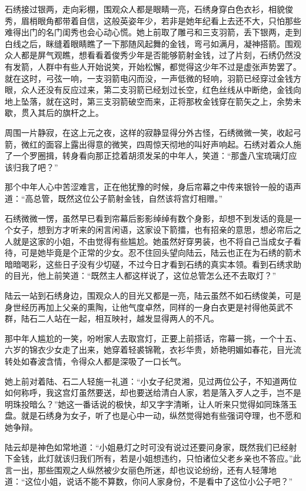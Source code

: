 石绣接过银两，走向彩棚，围观众人都是眼睛一亮，石绣身穿白色衣衫，相貌俊秀，眉梢眼角都带着自信，这般英姿年少，若非是她年纪看上去还不大，只怕那些难得出门的名门闺秀也会心动心慌。她上前取了雕弓和三支羽箭，丢下银两，走到白线之后，眯缝着眼睛瞧了一下那随风起舞的金钱，弯弓如满月，凝神搭箭。围观众人都是屏气观瞧，想看看着俊秀少年是否能够箭射金钱，过了片刻，石绣仍然没有发箭，人群中有些人开始说笑，开始松懈，都觉得这少年不过是虚张声势罢了。就在这时，弓弦一响，一支羽箭电闪而没，一声低微的轻响，羽箭已经穿过金钱方眼，众人还没有反应过来，第二支羽箭已经划过长空，红色丝线从中断绝，金钱向地上坠落，就在这时，第三支羽箭破空而来，正将那枚金钱穿在箭矢之上，余势未歇，贯入其后的旗杆之上。

周围一片静寂，在这上元之夜，这样的寂静显得分外古怪，石绣微微一笑，收起弓箭，微红的面容上露出得意的微笑，四周惊天彻地的叫好声响起。石绣对着众人施了一个罗圈揖，转身看向那正捻着胡须发呆的中年人，笑道：“那盏八宝琉璃灯应该归我了吧？”

那个中年人心中苦涩难言，正在他犹豫的时候，身后帘幕之中传来银铃一般的语声道：“高总管，既然这位公子箭射金钱，自然该将宫灯相赠。”

石绣微微一愣，虽然早已看到帘幕后影影绰绰有数个身影，却想不到发话的竟是一个女子，想到方才听来的闲言闲语，这家设下箭擂，也有招亲的意思，想必帘后之人就是这家的小姐，不由觉得有些尴尬。她虽然好穿男装，也不将自己当成女子看待，可是她毕竟是个正常的少女。忍不住回头望向陆云，陆云也正在为石绣的箭术暗暗喝彩，这些日子没有少切磋，不过今日才看到石绣的真实本领。看到石绣求助的目光，他上前笑道：“既然主人都这样说了，这位总管怎么还不去取灯？”

陆云一站到石绣身边，围观众人的目光又都是一亮，陆云虽然不如石绣俊美，可是身世经历再加上父亲的熏陶，让他气度卓然，同样的一身白衣更是衬得他英武不群，陆石二人站在一起，相互映衬，越发显得两人的不凡。

那中年人尴尬的一笑，吩咐家人去取宫灯，正要上前搭话，帘幕一挑，一个十五、六岁的锦衣少女走了出来，她穿着轻裘锦靴，衣衫华贵，娇艳明媚如春花，目光流转处如春波含情，令得众人都是深吸了一口长气。

她上前对着陆、石二人轻施一礼道：“小女子纪灵湘，见过两位公子，不知道两位如何称呼，我这宫灯虽然要送，却也要送给清白人家，若是落入歹人之手，岂不是明珠投暗么？”她这一番话说的极快，却又字字清晰，让人听来只觉得如同珠落玉盘。就是石绣身为女子，听了也是心中一动，纵然觉得她有些强词夺理，也不愿和她争辩。

陆云却是神色如常地道：“小姐悬灯之时可没有说过还要问身家，既然我们已经射下金钱，此灯就该归我们所有，若是小姐想违约，只怕诸位父老乡亲也不答应。”此言一出，那些围观之人纵然被少女丽色所迷，却也议论纷纷，还有人轻薄地道：“这位小姐，说话不能不算数，你问人家身份，不是看中了这位小公子吧？”

